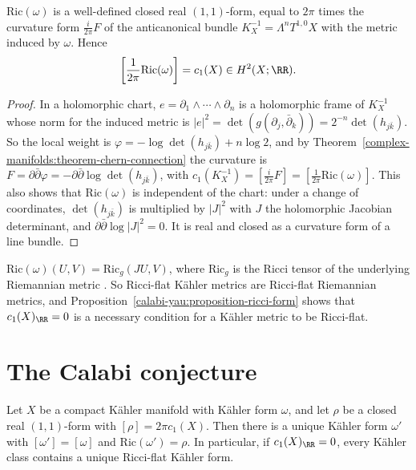 \begin{proposition}\label{calabi-yau:proposition-ricci-form}
$\mathrm{Ric}(\omega)$ is a well-defined closed real $(1,1)$-form, equal to $2\pi$ times the curvature form $\frac{i}{2\pi}F$ of the anticanonical bundle $K_X^{-1} = \Lambda^nT^{1,0}X$ with
the metric induced by $\omega$. Hence
\[
\left[\frac{1}{2\pi}\mathrm{Ric}(\omega)\right] = c_1(X) \in H^2(X; \RR) .
\]
\end{proposition}

\begin{proof}
In a holomorphic chart, $e = \partial_1 \wedge \cdots \wedge \partial_n$ is a holomorphic frame of $K_X^{-1}$ whose norm for the induced metric is $|e|^2 = \det(g(\partial_j, \bar\partial_k)) = 2^{-n}\det(h_{j\bar k})$.
So the local weight is $\varphi = -\log\det(h_{j\bar k}) + n\log 2$, and by Theorem~\ref{complex-manifolds:theorem-chern-connection} the curvature is
$F = \partial\bar\partial\varphi = -\partial\bar\partial\log\det(h_{j\bar k})$, with $c_1(K_X^{-1}) = [\frac{i}{2\pi}F] = [\frac{1}{2\pi}\mathrm{Ric}(\omega)]$. This also shows that
$\mathrm{Ric}(\omega)$ is independent of the chart: under a change of coordinates, $\det(h_{j\bar k})$ is multiplied by $|J|^2$ with $J$ the holomorphic Jacobian determinant, and
$\partial\bar\partial\log|J|^2 = 0$. It is real and closed as a curvature form of a line bundle.
\end{proof}

\begin{remark}\label{calabi-yau:remark-riemannian-ricci}
$\mathrm{Ric}(\omega)(U, V) = \mathrm{Ric}_g(JU, V)$, where $\mathrm{Ric}_g$ is the Ricci tensor of the underlying Riemannian metric \cite[Chapter 4]{huybrechts-complex}. So
Ricci-flat K\"ahler metrics are Ricci-flat Riemannian metrics, and Proposition~\ref{calabi-yau:proposition-ricci-form} shows that $c_1(X)_\RR = 0$ is a necessary
condition for a K\"ahler metric to be Ricci-flat.
\end{remark}

\section{The Calabi conjecture}\label{calabi-yau:section-calabi-conjecture}

\begin{theorem}\label{calabi-yau:theorem-yau}
Let $X$ be a compact K\"ahler manifold with K\"ahler form $\omega$, and let $\rho$ be a closed real $(1,1)$-form with $[\rho] = 2\pi c_1(X)$. Then there is a unique K\"ahler form
$\omega'$ with $[\omega'] = [\omega]$ and $\mathrm{Ric}(\omega') = \rho$. In particular, if $c_1(X)_\RR = 0$, every K\"ahler class contains a unique Ricci-flat K\"ahler form.
\end{theorem}

